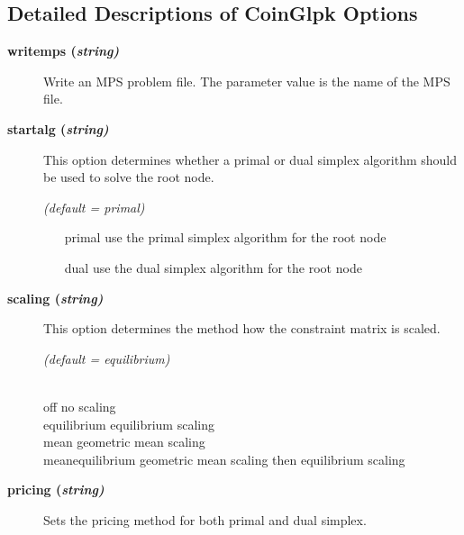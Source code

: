 \subsection{Detailed Descriptions of CoinGlpk Options}

\begin{description}

\item[\label{glpkwritemps}\hypertarget{glpkwritemps}
{\textbf{writemps (\slshape{string})}}]\hspace{1.0in}

Write an MPS problem file.
The parameter value is the name of the MPS file.


\item[\label{glpkstartalg}\hypertarget{glpkstartalg}
{\textbf{startalg (\slshape{string})}}]\hspace{1.0in}

This option determines whether a primal or dual simplex algorithm should be used to solve the root node.

\textsl{(default = primal)}
\begin{itemize}
\item[primal] use the primal simplex algorithm for the root node
\item[dual] use the dual simplex algorithm for the root node
\end{itemize}

\item[\label{scaling}\hypertarget{scaling}
{\textbf{scaling (\slshape{string})}}]\hspace{1.0in}

This option determines the method how the constraint matrix is scaled.

\textsl{(default = equilibrium)}
\begin{tabbing}
\hspace{1.1in} \= \\
off \> no scaling \\
equilibrium \> equilibrium scaling \\
mean \> geometric mean scaling \\
meanequilibrium \> geometric mean scaling then equilibrium scaling
\end{tabbing}

\item[\label{pricing}\hypertarget{pricing}
{\textbf{pricing (\slshape{string})}}]\hspace{1.0in}

Sets the pricing method for both primal and dual simplex.


\end{description}
